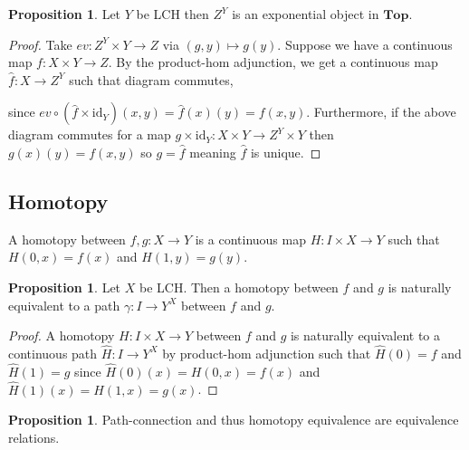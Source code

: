 \documentclass[12pt]{extarticle}
\newcommand{\id}{\mathrm{id}}
\newcommand{\Top}{\mathbf{Top}}
\theoremstyle{definition}
\newtheorem{proposition}[theorem]{Proposition}
\newenvironment{definition}[1][Definition:]{\begin{trivlist}
\item[\hskip \labelsep {\bfseries #1}]}{\end{trivlist}}
\begin{document}
\begin{proposition}
Let $Y$ be LCH then $Z^Y$ is an exponential object in $\Top$. 
\end{proposition}

\begin{proof}
Take $ev : Z^Y \times Y \to Z$ via $(g, y) \mapsto g(y)$. Suppose we have a continuous map $f : X \times Y \to Z$. By the product-hom adjunction, we get a continuous map $\hat{f} : X \to Z^Y$ such that diagram commutes,
\begin{center}
\end{center}
since $ev \circ (\hat{f} \times \id_Y)(x,y) = \hat{f}(x)(y) = f(x,y)$. Furthermore, if the above diagram commutes for a map $g \times \id_Y : X \times Y \to Z^Y \times Y$ then $g(x)(y) = f(x,y)$ so $g = \hat{f}$ meaning $\hat{f}$ is unique.  
\end{proof}

\subsection{Homotopy}

\begin{definition}
A homotopy between $f,g : X \to Y$ is a continuous map $H : I \times X \to Y$ such that $H(0, x) = f(x)$ and $H(1, y) = g(y)$.  
\end{definition}

\begin{proposition}
Let $X$ be LCH. Then a homotopy between $f$ and $g$ is naturally equivalent to a path $\gamma : I \to Y^X$ between $f$ and $g$.
\end{proposition}

\begin{proof}
A homotopy $H : I \times X \to Y$ between $f$ and $g$ is naturally equivalent to a continuous path $\hat{H} : I \to Y^X$ by product-hom adjunction such that $\hat{H}(0) = f$ and $\hat{H}(1) = g$ since $\hat{H}(0)(x) = H(0, x) = f(x)$ and $\hat{H}(1)(x) = H(1, x) = g(x)$.  
\end{proof}

\begin{proposition}
Path-connection and thus homotopy equivalence are equivalence relations.
\end{proposition}
\end{document}
